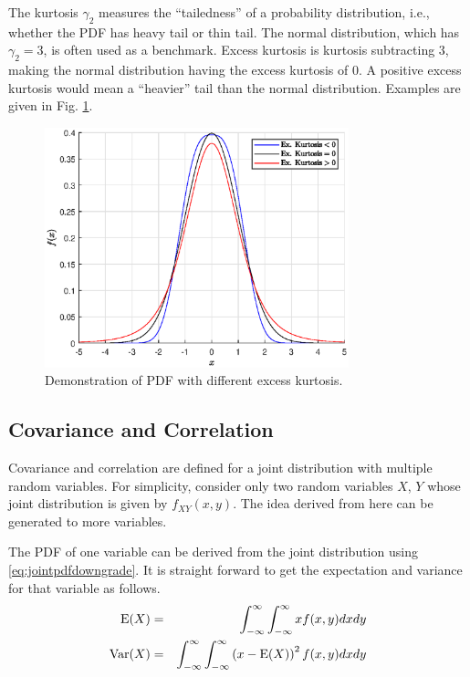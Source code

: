 The kurtosis $\gamma_2$ measures the ``tailedness'' of a probability distribution, i.e., whether the PDF has heavy tail or thin tail. The normal distribution, which has $\gamma_2=3$, is often used as a benchmark. Excess kurtosis is kurtosis subtracting $3$, making the normal distribution having the excess kurtosis of $0$. A positive excess kurtosis would mean a ``heavier'' tail than the normal distribution. Examples are given in Fig. \ref{fig:kurtosis_demo}.
\begin{figure}[!htb]
	\centering
	\includegraphics[width=250pt]{chapters/part-1/figures/kurtosis_demo.eps}
	\caption{Demonstration of PDF with different excess kurtosis.} \label{fig:kurtosis_demo}
\end{figure}

\subsection{Covariance and Correlation}

Covariance and correlation are defined for a joint distribution with multiple random variables. For simplicity, consider only two random variables $X$, $Y$ whose joint distribution is given by $f_{XY}(x, y)$. The idea derived from here can be generated to more variables.

The PDF of one variable can be derived from the joint distribution using \eqref{eq:jointpdfdowngrade}. It is straight forward to get the expectation and variance for that variable as follows.
\begin{eqnarray}
	\textup{E}(X) &=& \int_{-\infty}^{\infty}\int_{-\infty}^{\infty}xf(x, y)dxdy \nonumber \\
	\textup{Var}(X) &=& \int_{-\infty}^{\infty}\int_{-\infty}^{\infty}\left(x-\textup{E}(X)\right)^2f(x, y)dxdy \nonumber
\end{eqnarray}

